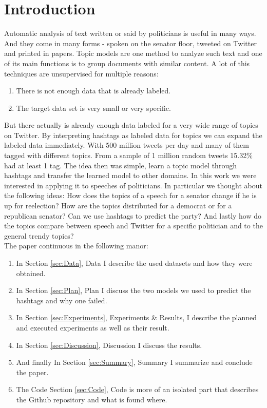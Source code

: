 \documentclass[10pt,conference,compsocconf]{IEEEtran}
\begin{document}
\section{Introduction}
Automatic analysis of text written or said by politicians is useful in many ways. And they come in many forms - spoken on the senator floor, tweeted on Twitter and printed in papers. 
Topic models are one method to analyze such text and one of its main functions is to group documents with similar content. A lot of this techniques are unsupervised for multiple reasons: \begin{enumerate}
	\item There is not enough data that is already labeled. 
	\item The target data set is very small or very specific. 
\end{enumerate} 
But there actually is already enough data labeled for a very wide range of topics on Twitter. By interpreting hashtags as labeled data for topics we can expand the labeled data immediately. With 500 million tweets per day \cite{twitter_stats} and many of them tagged with different topics. From a sample of 1 million random tweets 15.32\% had at least 1 tag. The idea then was simple, learn a topic model through hashtags and transfer the learned model to other domains. In this work we were interested in applying it to speeches of politicians. In particular we thought about the following ideas: How does the topics of a speech for a senator change if he is up for reelection? How are the topics distributed for a democrat or for a republican senator? Can we use hashtags to predict the party? And lastly how do the topics compare between speech and Twitter for a specific politician and to the general trendy topics? \\
The paper continuous in the following manor: 
\begin{enumerate}
	\item In Section \ref{sec:Data}, Data I describe the used datasets and how they were obtained. \\
	\item In Section \ref{sec:Plan}, Plan I discuss the two models we used to predict the hashtags and why one failed. \\
	\item In Section \ref{sec:Experiments}, Experiments \& Results, I describe the planned and executed experiments as well as their result.\\
	\item In Section \ref{sec:Discussion}, Discussion I discuss the results.\\
	
	\item And finally In Section \ref{sec:Summary}, Summary I summarize and conclude the paper. \\
	\item The Code Section \ref{sec:Code}, Code is more of an isolated part that describes the Github repository and what is found where. 
\end{enumerate}
\end{document}
